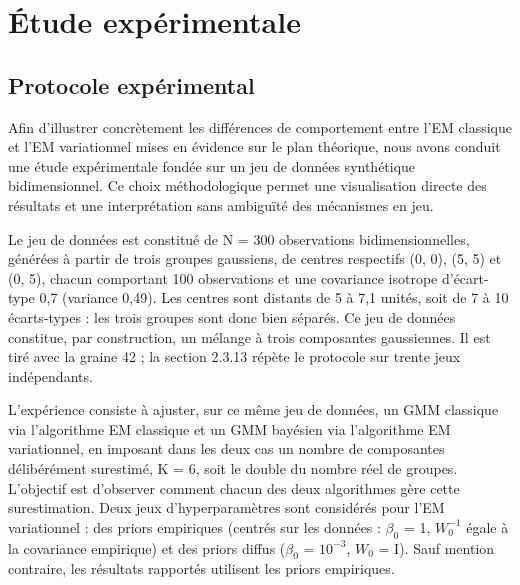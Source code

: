 \section{Étude expérimentale}
\subsection{Protocole expérimental}
Afin d'illustrer concrètement les différences de comportement entre l'EM classique et l'EM variationnel mises en évidence sur le plan théorique, nous avons conduit une étude expérimentale fondée sur un jeu de données synthétique bidimensionnel. Ce choix méthodologique permet une visualisation directe des résultats et une interprétation sans ambiguïté des mécanismes en jeu.

Le jeu de données est constitué de N = 300 observations bidimensionnelles, générées à partir de trois groupes gaussiens, de centres respectifs (0, 0), (5, 5) et (0, 5), chacun comportant 100 observations et une covariance isotrope d'écart-type 0,7 (variance 0,49). Les centres sont distants de 5 à 7,1 unités, soit de 7 à 10 écarts-types : les trois groupes sont donc bien séparés. Ce jeu de données constitue, par construction, un mélange à trois composantes gaussiennes. Il est tiré avec la graine 42 ; la section 2.3.13 répète le protocole sur trente jeux indépendants.

L'expérience consiste à ajuster, sur ce même jeu de données, un GMM classique via l'algorithme EM classique et un GMM bayésien via l'algorithme EM variationnel, en imposant dans les deux cas un nombre de composantes délibérément surestimé, K = 6, soit le double du nombre réel de groupes. L'objectif est d'observer comment chacun des deux algorithmes gère cette surestimation. Deux jeux d'hyperparamètres sont considérés pour l'EM variationnel : des priors empiriques (centrés sur les données : $\beta _{0}$ = 1, $W_{0}^{-1}$ égale à la covariance empirique) et des priors diffus ($\beta _{0}$ = $10^{-3}$, $W_{0}$ = I). Sauf mention contraire, les résultats rapportés utilisent les priors empiriques.

